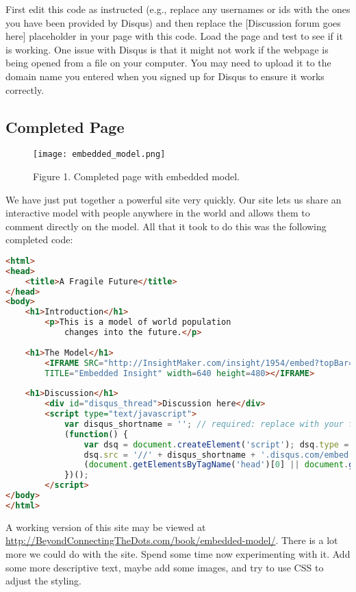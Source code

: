 \documentclass[]{memoir}
\let\Oldincludegraphics\includegraphics
\renewcommand{\includegraphics}[1]{\Oldincludegraphics[max size={\textwidth}{\textheight}]{#1}}
\begin{document}
First edit this code as instructed (e.g., replace any usernames or ids
with the ones you have been provided by Disqus) and then replace the
{[}Discussion forum goes here{]} placeholder in your page with this
code. Load the page and test to see if it is working. One issue with
Disqus is that it might not work if the webpage is being opened from a
file on your computer. You may need to upload it to the domain name you
entered when you signed up for Disqus to ensure it works correctly.

\subsection{Completed Page}

\begin{figure}[htbp]
\centering
\texttt{[image: embedded\_model.png]}
\caption{Figure 1. Completed page with embedded model.}
\end{figure}

We have just put together a powerful site very quickly. Our site lets us
share an interactive model with people anywhere in the world and allows
them to comment directly on the model. All that it took to do this was
the following completed code:

\begin{lstlisting}[language=HTML]
<html>
<head>
    <title>A Fragile Future</title>
</head>
<body>
    <h1>Introduction</h1>
        <p>This is a model of world population
            changes into the future.</p>
            
    <h1>The Model</h1>
        <IFRAME SRC="http://InsightMaker.com/insight/1954/embed?topBar=1&sideBar=1&zoom=1"
        TITLE="Embedded Insight" width=640 height=480></IFRAME>
        
    <h1>Discussion</h1>
        <div id="disqus_thread">Discussion here</div>
        <script type="text/javascript">
            var disqus_shortname = ''; // required: replace with your forum shortname
            (function() {
                var dsq = document.createElement('script'); dsq.type = 'text/javascript'; dsq.async = true;
                dsq.src = '//' + disqus_shortname + '.disqus.com/embed.js';
                (document.getElementsByTagName('head')[0] || document.getElementsByTagName('body')[0]).appendChild(dsq);
            })();
        </script>     
</body>
</html>
\end{lstlisting}

A working version of this site may be viewed at
\url{http://BeyondConnectingTheDots.com/book/embedded-model/}. There is
a lot more we could do with the site. Spend some time now experimenting
with it. Add some more descriptive text, maybe add some images, and try
to use CSS to adjust the styling.
\end{document}

